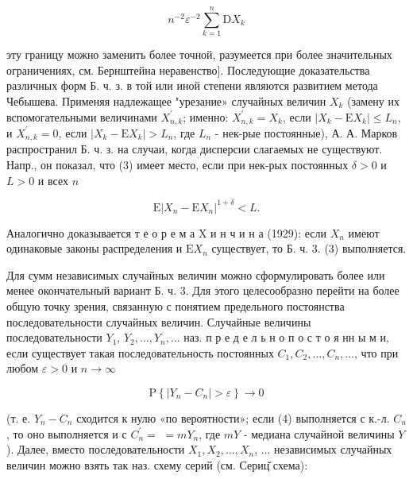 \documentclass[10pt]{article}
\begin{document}
\[

n^{-2} \varepsilon^{-2} \sum_{k=1}^{n} \mathrm{D} X_{k}

\]



эту границу можно заменить более точной, разумеется при более значительных ограничениях, см. Бернштейна неравенство]. Последующие доказательства различных форм Б. ч. з. в той или иной степени являются развитием метода Чебышева. Применяя надлежащее "урезание» случайных величин $X_{k}$ (замену их вспомогательными величинами $X_{n, k}^{\prime}$; именно: $X_{n, k}^{\prime}=X_{k}$, если $\left|X_{k}-\mathrm{E} X_{k}\right| \leqslant L_{n}$, и $X_{n, k}^{\prime}=0$, если $\left|X_{k}-\mathrm{E} X_{k}\right|>L_{n}$, где $L_{n}$ - нек-рые постоянные), А. А. Марков распространил Б. ч. з. на случаи, когда дисперсии слагаемых не существуют. Напр., он показал, что (3) имеет место, если при нек-рых постоянных $\delta>0$ и $L>0$ и всех $n$



\[

\mathrm{E}\left|X_{n}-\mathrm{E} X_{n}\right|^{1+\delta}<L .

\]



Аналогично доказывается т е о р е м а $\mathrm{X}$ и н ч и н а (1929): если $X_{n}$ имеют одинаковые законы распределения и $\mathrm{E} X_{n}$ существует, то Б. ч. 3. (3) выполняется.



Для сумм независимых случайных величин можно сформулировать более или менее окончательный вариант Б. ч. 3. Для этого целесообразно перейти на более общую точку зрения, связанную с понятием предельного постоянства последовательности случайных величин. Случайные величины последовательности $Y_{1}$, $Y_{2}, \ldots, Y_{n}, \ldots$ наз. $п$ р е д е л ь н о п о с т о я нн ы м и, если существует такая последовательность постоянных $C_{1}, C_{2}, \ldots, C_{n}, \ldots$, что при любом $\varepsilon>0$ и $n \rightarrow \infty$



\[

\mathrm{P}\left\{\left|Y_{n}-C_{n}\right|>\varepsilon\right\} \longrightarrow 0

\]



(т. е. $Y_{n}-C_{n}$ сходится к нулю «по вероятности»; если (4) выполняется с к.-л. $C_{n}$, то оно выполняется и с $C_{n}^{\prime}=$ $=m Y_{n}$, где $m Y$ - медиана случайной величины $Y$ ). Далее, вместо последовательности $X_{1}, X_{2}, \ldots, X_{n}$, ... независимых случайных величин можно взять так наз. схему серий (см. Сериц̆ схема):
\end{document}
